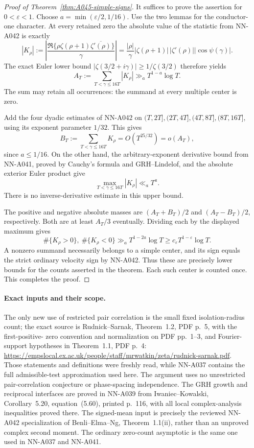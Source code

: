 \begin{proof}[Proof of Theorem~\ref{thm:A045-simple-signs}]
It suffices to prove the assertion for \(0<\varepsilon<1\).
Choose \(a=\min(\varepsilon/2,1/16)\).
Use the two lemmas for the conductor-one character.
At every retained zero the absolute value of the statistic
from NN-A042 is exactly
\[
 \left|K_\rho\right|
 :=\left|\frac{\Re\{\rho\zeta(\rho+1)
                          \overline{\zeta'(\rho)}\}}{\gamma}\right|
 =\frac{|\rho|}{\gamma}|\zeta(\rho+1)|\,|\zeta'(\rho)|
                                     |\cos\psi(\gamma)|.
\]
The exact Euler lower bound
\(|\zeta(3/2+i\gamma)|\ge1/\zeta(3/2)\) therefore yields
\[
 A_T:=\sum_{T<\gamma\le16T}|K_\rho|
                              \gg_a T^{1-a}\log T.
\]
The sum may retain all occurrences: the summand at every
multiple center is zero.

Add the four dyadic estimates of NN-A042 on
\((T,2T],(2T,4T],(4T,8T],(8T,16T]\), using its exponent
parameter \(1/32\). This gives
\[
 B_T:=\sum_{T<\gamma\le16T}K_\rho
                                 =O(T^{25/32})=o(A_T),
\]
since \(a\le1/16\).
On the other hand, the arbitrary-exponent derivative bound
from NN-A041, proved by Cauchy's formula and GRH--Lindelof,
and the absolute exterior Euler product give
\[
                \max_{T<\gamma\le16T}|K_\rho|\ll_a T^a.
\]
There is no inverse-derivative estimate in this upper bound.

The positive and negative absolute masses are
\((A_T+B_T)/2\) and \((A_T-B_T)/2\), respectively.
Both are at least \(A_T/3\) eventually. Dividing each by
the displayed maximum gives
\[
       \#\{K_\rho>0\},\ \#\{K_\rho<0\}
                    \gg_a T^{1-2a}\log T
                    \ge c_\varepsilon T^{1-\varepsilon}\log T.
\]
A nonzero summand necessarily belongs to a simple center,
and its sign equals the strict ordinary velocity sign by
NN-A042. Thus these are precisely lower bounds for the
counts asserted in the theorem. Each such center is counted
once. This completes the proof.
\end{proof}

\paragraph{Exact inputs and their scope.}
The only new use of restricted pair correlation is the
small fixed isolation-radius count; the exact source is
Rudnick--Sarnak, Theorem~1.2, PDF p.~5, with the first-positive-
zero convention and normalization on PDF pp.~1--3, and
Fourier-support hypotheses in Theorem~1.1, PDF p.~4:
\url{https://empslocal.ex.ac.uk/people/staff/mrwatkin/zeta/rudnick-sarnak.pdf}.
Those statements and definitions were freshly read, while
NN-A037 contains the full admissible-test approximation used
here. The argument uses no unrestricted pair-correlation
conjecture or phase-spacing independence.
The GRH growth and reciprocal interfaces are proved in
NN-A039 from Iwaniec--Kowalski, Corollary~5.20,
equation~(5.60), printed p.~116, with all local complex-analysis
inequalities proved there. The signed-mean input is precisely
the reviewed NN-A042 specialization of Benli--Elma--Ng,
Theorem~1.1(ii), rather than an unproved complex second moment.
The ordinary zero-count asymptotic is the same one used in
NN-A037 and NN-A041.

